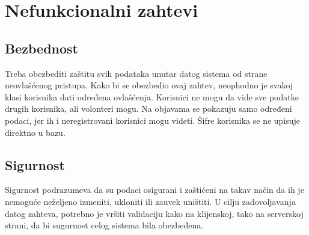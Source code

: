 \section{Nefunkcionalni zahtevi}
\subsection{Bezbednost}
\par Treba obezbediti zaštitu svih podataka unutar datog sistema od strane neovlašćenog pristupa. Kako bi se obezbedio ovaj zahtev, neophodno je svakoj klasi korisnika dati određena ovlašćenja.
Korisnici ne mogu da vide sve podatke drugih korisnika, ali volonteri mogu. Na objavama se pokazuju samo određeni podaci, jer ih i neregistrovani korisnici mogu videti. Šifre korisnika se ne
upisuje direktno u bazu.
\subsection{Sigurnost}
\par Sigurnost podrazumeva da su podaci osigurani i zaštićeni na takav način da ih je nemoguće neželjeno izmeniti, ukloniti ili zauvek uništiti. U cilju zadovoljavanja datog zahteva, potrebno
je vršiti validaciju kako na klijenskoj, tako na serverskoj strani, da bi sugurnost celog sistema bila obezbeđena.